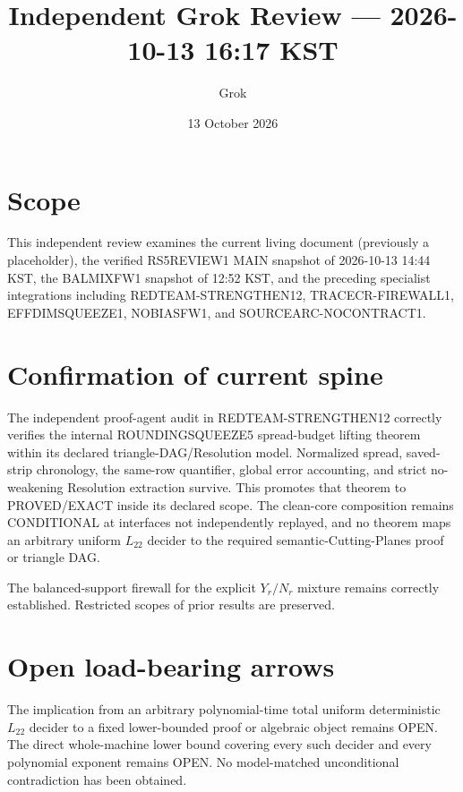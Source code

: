 \documentclass[11pt]{article}
\title{Independent Grok Review --- 2026-10-13 16:17 KST}
\author{Grok}
\date{13 October 2026}
\begin{document}
\maketitle

\begin{center}
\end{center}

\section{Scope}
This independent review examines the current living document (previously a placeholder), the verified RS5REVIEW1 MAIN snapshot of 2026-10-13 14:44 KST, the BALMIXFW1 snapshot of 12:52 KST, and the preceding specialist integrations including REDTEAM-STRENGTHEN12, TRACECR-FIREWALL1, EFFDIMSQUEEZE1, NOBIASFW1, and SOURCEARC-NOCONTRACT1.

\section{Confirmation of current spine}
The independent proof-agent audit in REDTEAM-STRENGTHEN12 correctly verifies the internal ROUNDINGSQUEEZE5 spread-budget lifting theorem within its declared triangle-DAG/Resolution model. Normalized spread, saved-strip chronology, the same-row quantifier, global error accounting, and strict no-weakening Resolution extraction survive. This promotes that theorem to PROVED/EXACT inside its declared scope. The clean-core composition remains CONDITIONAL at interfaces not independently replayed, and no theorem maps an arbitrary uniform $L_{22}$ decider to the required semantic-Cutting-Planes proof or triangle DAG.

The balanced-support firewall for the explicit $Y_r/N_r$ mixture remains correctly established. Restricted scopes of prior results are preserved.

\section{Open load-bearing arrows}
The implication from an arbitrary polynomial-time total uniform deterministic $L_{22}$ decider to a fixed lower-bounded proof or algebraic object remains OPEN. The direct whole-machine lower bound covering every such decider and every polynomial exponent remains OPEN. No model-matched unconditional contradiction has been obtained.
\end{document}
